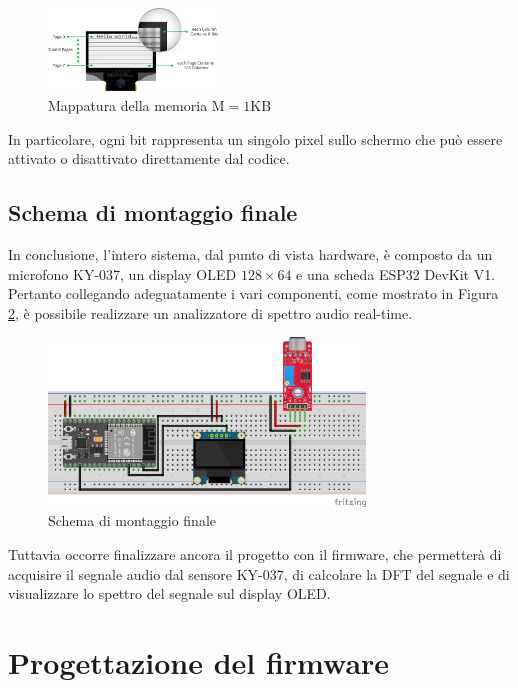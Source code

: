 \documentclass[a4paper,12pt]{report}  %
\begin{document}
\begin{figure}[h]
    \centering
    \includegraphics[width=0.4\textwidth]{imgs/1KB-128x64-OLED-Display-RAM-Memory-Map.png}
    \caption{Mappatura della memoria $\text{M} = 1 \text{KB}$}
    \label{fig:memory-mapping}
\end{figure}

In particolare, ogni bit rappresenta un singolo pixel sullo schermo che può essere attivato o disattivato direttamente dal codice.

\subsection{Schema di montaggio finale}
In conclusione, l'intero sistema, dal punto di vista hardware, è composto da un microfono KY-037, un display OLED $128 \times 64$ e una scheda ESP32 DevKit V1.
Pertanto collegando adeguatamente i vari componenti, come mostrato in Figura \ref{fig:final-schematic}, è possibile realizzare un analizzatore di spettro audio real-time.

\begin{figure}[h]
    \centering
    \includegraphics[width=0.75\textwidth]{imgs/schema-di-montaggio.png}
    \caption{Schema di montaggio finale}
    \label{fig:final-schematic}
\end{figure}

Tuttavia occorre finalizzare ancora il progetto con il firmware, che permetterà di acquisire il segnale audio dal sensore KY-037, di calcolare la DFT del segnale e di visualizzare lo spettro del segnale sul display OLED.

\section{Progettazione del firmware}\label{sec:code}
\end{document}
